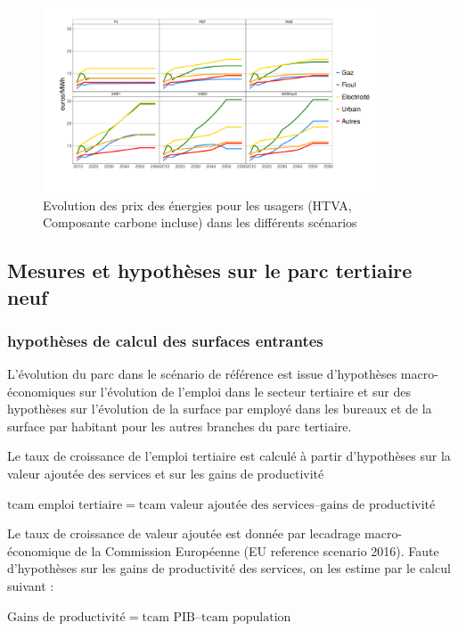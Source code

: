 \documentclass[10.5pt,a4paper]{article}
\begin{document}
{\begin{figure}[h!]
\centering
\caption{Evolution des prix des énergies pour les usagers (HTVA, Composante carbone incluse) dans les différents scénarios}\label{Evol_prix_scen-1}
\includegraphics[width = 0.9\textwidth]{Evol_prix_scen-1}  
\end{figure}

\clearpage

\subsection{Mesures et hypothèses sur le parc tertiaire neuf}

\subsubsection{hypothèses de calcul des surfaces entrantes}

L'évolution du parc dans le scénario de référence est issue d'hypothèses macro-économiques sur l’évolution de l’emploi dans le secteur tertiaire et sur des hypothèses sur l’évolution de la surface par employé dans les bureaux et de la surface par habitant pour les autres branches du parc tertiaire. 

Le taux de croissance de l'emploi tertiaire est calculé à partir d'hypothèses sur la valeur ajoutée des services et sur les gains de productivité 

$\textrm{tcam emploi tertiaire} = \textrm{tcam valeur ajoutée des services} – \textrm{gains de productivité}$

Le taux de croissance de valeur ajoutée est donnée par lecadrage macro-économique de la Commission Européenne (EU reference scenario 2016). Faute d’hypothèses sur les gains de productivité des services, on les estime par le calcul suivant :

$\textrm{Gains de productivité} = \textrm{tcam PIB} – \textrm{tcam population}$

}
\end{document}
